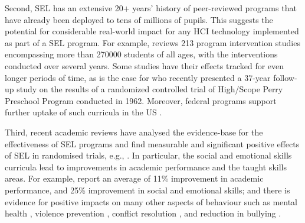 \documentclass[prodmode,acmtochi]{acmsmall}
\newcommand{\rephrase}[1]{\textrm{\textrm{\textcolor{gray}{#1}}}}
\begin{document}
Second, SEL has an extensive 20+ years' history of peer-reviewed programs that have already been deployed to tens of millions of pupils. This suggests the potential for considerable real-world impact for any HCI technology implemented as part of a SEL program. For example,  reviews 213 program intervention studies encompassing more than 270000 students of all ages, with the interventions conducted over several years. Some studies have their effects tracked for even longer periods of time, as is the case for  who recently presented a 37-year follow-up study on the results of a randomized controlled trial of High/Scope Perry Preschool Program conducted in 1962. Moreover, federal programs support further uptake of such curricula in the US \cite{CASEL2013}. 

Third, recent academic reviews have analysed the evidence-base for the effectiveness of SEL programs and find measurable and significant positive effects of SEL in randomised trials, e.g., \cite{Durlak2011,Greenberg2010,Weare2011}. In particular, the social and emotional skills curricula lead to improvements in  academic performance and the taught skills areas. For example,  report an average of 11\% improvement in academic performance, and 25\% improvement in social and emotional skills; and there is evidence for positive impacts on many other aspects of behaviour such as mental health \cite{Adi2007a}, violence prevention \cite{Mytton2006,Adi2007b}, conflict resolution \cite{Garrard2007},  and reduction in bullying \cite{Vreeman2007}. %


\end{document}
